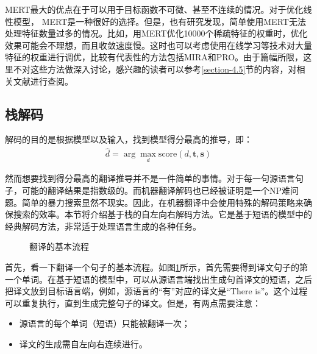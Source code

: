 \parinterval MERT最大的优点在于可以用于目标函数不可微、甚至不连续的情况。对于优化线性模型， MERT是一种很好的选择。但是，也有研究发现，简单使用MERT无法处理特征数量过多的情况。比如，用MERT优化10000个稀疏特征的权重时，优化效果可能会不理想，而且收敛速度慢。这时也可以考虑使用在线学习等技术对大量特征的权重进行调优，比较有代表性的方法包括MIRA\cite{DBLP:conf/emnlp/ChiangMR08}和PRO\cite{Hopkins2011Tuning}。由于篇幅所限，这里不对这些方法做深入讨论，感兴趣的读者可以参考\ref{section-4.5}节的内容，对相关文献进行查阅。


\subsection{栈解码}

\parinterval 解码的目的是根据模型以及输入，找到模型得分最高的推导，即：
\begin{eqnarray}
\hat{d} = \arg\max_{d} \textrm{score}(d,\mathbf{t},\mathbf{s})
\label{eq:4-21}
\end{eqnarray}

\parinterval 然而想要找到得分最高的翻译推导并不是一件简单的事情。对于每一句源语言句子，可能的翻译结果是指数级的。而机器翻译解码也已经被证明是一个NP难问题\cite{knight1999decoding}。简单的暴力搜索显然不现实。因此，在机器翻译中会使用特殊的解码策略来确保搜索的效率。本节将介绍基于栈的自左向右解码方法。它是基于短语的模型中的经典解码方法，非常适于处理语言生成的各种任务。

\begin{figure}[htp]
\centering

\caption{翻译的基本流程}
\label{fig:4-26}
\end{figure}

\parinterval 首先，看一下翻译一个句子的基本流程。如图\ref{fig:4-26}所示，首先需要得到译文句子的第一个单词。在基于短语的模型中，可以从源语言端找出生成句首译文的短语，之后把译文放到目标语言端，例如，源语言的``有''对应的译文是``There is''。这个过程可以重复执行，直到生成完整句子的译文。但是，有两点需要注意：

\begin{itemize}
\vspace{0.5em}
\item 源语言的每个单词（短语）只能被翻译一次；
\vspace{0.5em}
\item 译文的生成需自左向右连续进行。
\vspace{0.5em}
\end{itemize}


